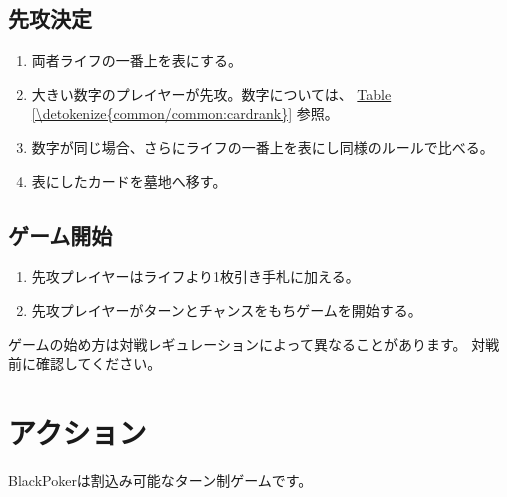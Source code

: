 \documentclass[letterpaper,10pt,dvipdfmx]{sphinxmanual}
\begin{document}
\subsection{先攻決定}
\label{\detokenize{common/common:common-gamestart-first}}\label{\detokenize{common/common:id18}}\begin{enumerate}
%
\item {} 
\sphinxAtStartPar
両者ライフの一番上を表にする。

\item {} 
\sphinxAtStartPar
大きい数字のプレイヤーが先攻。数字については、 \hyperref[\detokenize{common/common:cardrank}]{Table \ref{\detokenize{common/common:cardrank}}} 参照。

\item {} 
\sphinxAtStartPar
数字が同じ場合、さらにライフの一番上を表にし同様のルールで比べる。

\item {} 
\sphinxAtStartPar
表にしたカードを墓地へ移す。

\end{enumerate}


\subsection{ゲーム開始}
\label{\detokenize{common/common:common-gamestart-start}}\label{\detokenize{common/common:id19}}\begin{enumerate}
%
\item {} 
\sphinxAtStartPar
先攻プレイヤーはライフより1枚引き手札に加える。

\item {} 
\sphinxAtStartPar
先攻プレイヤーがターンとチャンスをもちゲームを開始する。

\end{enumerate}

\sphinxAtStartPar
ゲームの始め方は対戦レギュレーションによって異なることがあります。
対戦前に確認してください。

\ignorespaces 

\section{アクション}
\label{\detokenize{common/common:index-15}}\label{\detokenize{common/common:id20}}
\sphinxAtStartPar
BlackPokerは割込み可能なターン制ゲームです。
\end{document}
